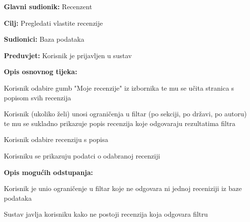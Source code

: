 					\noindent {}
					\begin{packed_item}
						
						\item \textbf{Glavni sudionik: } Recenzent
						\item  \textbf{Cilj:} Pregledati vlastite recenzije
						\item  \textbf{Sudionici:} Baza podataka
						\item  \textbf{Preduvjet:} Korisnik je prijavljen u sustav
						\item  \textbf{Opis osnovnog tijeka:}
						
						\item[] \begin{packed_enum}
							
							\item Korisnik odabire gumb "Moje recenzije" iz izbornika te mu se učita stranica s popisom svih recenzija
							\item Korisnik (ukoliko želi) unosi ograničenja u filtar (po sekciji, po državi, po autoru) te mu se sukladno prikazuje popis recenzija koje odgovaraju rezultatima filtra
							\item Korisnik odabire recenziju s popisa
							\item Korisniku se prikazuju podatci o odabranoj recenziji
							
							
						\end{packed_enum}
							\item \textbf{Opis mogućih odstupanja:}
						
							\item[] \begin{packed_enum}
							
							\item[2.a] Korisnik je unio ograničenje u filtar koje ne odgovara ni jednoj receniziji iz baze podataka
							\item[] \begin{packed_enum}
								\item[1.] Sustav javlja korisniku kako ne postoji recenzija koja odgovara filtru
							\end{packed_enum}
						\end{packed_enum}
						
					\end{packed_item}
					
